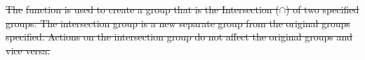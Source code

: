 \documentclass[12pt]{report} %
\providecommand{\DIFdeltex}[1]{{\protect\color{red}\sout{#1}}}                      %
\providecommand{\DIFdelbegin}{} %
\providecommand{\DIFdel}[1]{\texorpdfstring{\DIFdeltex{#1}}{}} %
\newcommand{\DIFscaledelfig}{0.5}
\newlength{\DIFdelgraphicswidth} %
\newlength{\DIFdelgraphicsheight} %
\newcommand{\DIFdelincludegraphics}[2][]{%
\sbox{\DIFdelgraphicsbox}{\DIFOincludegraphics[#1]{#2}}%
\settoboxwidth{\DIFdelgraphicswidth}{\DIFdelgraphicsbox} %
\settoboxtotalheight{\DIFdelgraphicsheight}{\DIFdelgraphicsbox} %
\scalebox{\DIFscaledelfig}{%
\parbox[b]{\DIFdelgraphicswidth}{\usebox{\DIFdelgraphicsbox}\\[-\baselineskip] \rule{\DIFdelgraphicswidth}{0em}}\llap{\resizebox{\DIFdelgraphicswidth}{\DIFdelgraphicsheight}{%
\setlength{\unitlength}{\DIFdelgraphicswidth}%
\begin{picture}(1,1)%
\thicklines\linethickness{2pt} %
{\color[rgb]{1,0,0}\put(0,0){\framebox(1,1){}}}%
{\color[rgb]{1,0,0}\put(0,0){\line( 1,1){1}}}%
{\color[rgb]{1,0,0}\put(0,1){\line(1,-1){1}}}%
\end{picture}%
}\hspace*{3pt}}} %
} %
\DeclareRobustCommand{\DIFdelbegin}{\DIFOdelbegin \let\includegraphics\DIFdelincludegraphics} %
\begin{document}
\DIFdelbegin %


\DIFdel{The }%
\DIFdel{function is used to create a group that is the Intersection ($\cap$) of two specified groups.
The intersection group is a new separate group from the original groups specified.
Actions on the intersection group do not affect the original groups and vice versa.
}%

\end{document}
